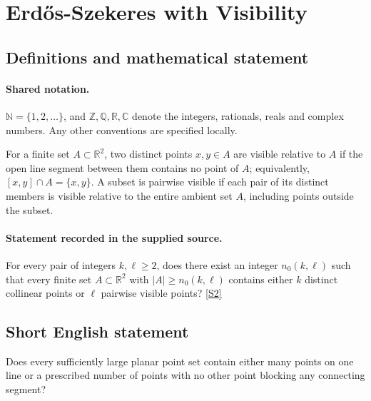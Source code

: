 \documentclass[11pt]{article}
\newcommand{\sref}[2]{\hyperlink{source:#1:#2}{[S#2]}}
\begin{document}
\section{Erdős-Szekeres with Visibility}\label{statement}

\subsection{Definitions and mathematical statement}

\paragraph{Shared notation.}$\mathbb N=\{1,2,\ldots\}$, and $\mathbb Z,\mathbb Q,\mathbb R,\mathbb C$ denote the integers, rationals, reals and complex numbers. Any other conventions are specified locally.


For a finite set $A\subset\mathbb R^2$, two distinct points $x,y\in A$ are visible relative to $A$ if the open line segment between them contains no point of $A$; equivalently, $[x,y]\cap A=\{x,y\}$. A subset is pairwise visible if each pair of its distinct members is visible relative to the entire ambient set $A$, including points outside the subset.
\paragraph{Statement recorded in the supplied source.}
For every pair of integers $k,\ell\geq2$, does there exist an integer $n_0(k,\ell)$ such that every finite set $A\subset\mathbb R^2$ with $|A|\geq n_0(k,\ell)$ contains either $k$ distinct collinear points or $\ell$ pairwise visible points? \sref{statement}{2}
\subsection{Short English statement}
Does every sufficiently large planar point set contain either many points on one line or a prescribed number of points with no other point blocking any connecting segment?
\end{document}
